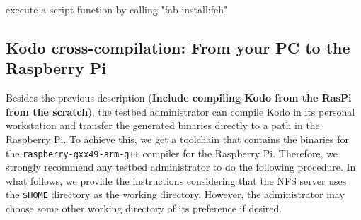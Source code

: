 execute a script function by calling "fab install:feh"

\subsection{Kodo cross-compilation: From your PC to the Raspberry Pi}

Besides the previous description (\textbf{Include compiling Kodo from the
RasPi from the scratch}), the testbed administrator can compile Kodo in its
personal workstation and transfer the generated binaries directly to
a path in the Raspberry Pi. To achieve this, we get a toolchain that
contains the binaries for the \texttt{raspberry-gxx49-arm-g++} compiler
for the Raspberry Pi. Therefore, we strongly recommend any testbed
administrator to do the following procedure. In what follows, we provide
the instructions considering that the NFS server uses the \texttt{\$HOME}
directory as the working directory. However, the administrator may choose
some other working directory of its preference if desired.

